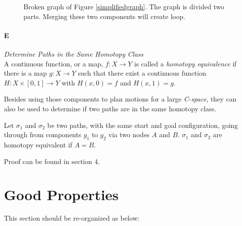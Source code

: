 \documentclass[11pt]{article}
\begin{document}
\begin{figure}
	\caption{\label{broken}} Broken graph of Figure \ref{simplifiedgraph}. The graph is divided two parts. Merging these two components will create loop. 
\end{figure}

\paragraph{E} \emph{Determine Paths in the Same Homotopy Class} \hfill \\
\indent A continuous function, or a map, $f: X \rightarrow Y$ is called a \emph{homotopy equivalence} if there is a map $g: X \rightarrow Y$ such that there exist a continuous function $H: X \times [0,1] \rightarrow Y$ with $H(x, 0) = f$ and $H(x,1) = g$.

\indent Besides using those components to plan motions for a large \emph{C-space}, they can also be used to determine if two paths are in the same homotopy class. 

\indent Let $\sigma_1$ and $\sigma_2$ be two paths, with the same start and goal configuration, going through from components $g_1$ to $g_2$ via two nodes $A$ and $B$. $\sigma_1$ and $\sigma_2$ are homotopy equivalent if $A = B$. 

\indent Proof can be found in section 4.

%
\section{Good Properties}\label{properties}
\indent\indent This section should be re-organized as below:
\end{document}
